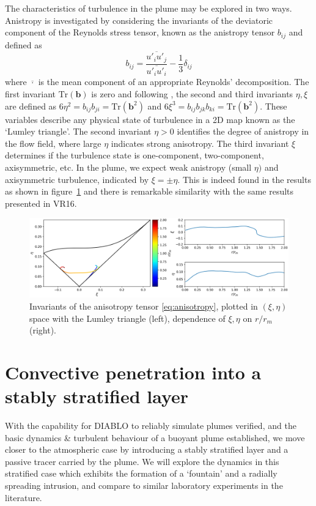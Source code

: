 \documentclass[a4paper]{article}
\begin{document}
The characteristics of turbulence in the plume may be explored in two ways. Anistropy is investigated by
considering the invariants of the deviatoric component of the Reynolds stress tensor, known as the
anistropy tensor $b_{ij}$ and defined as
\begin{equation}
	b_{ij} = \frac{\overline{u'_iu'_j}}{\overline{u'_iu'_i}} - \frac{1}{3}\delta_{ij}
	\label{eq:anisotropy}
\end{equation}
where $\overline{\cdot}$ is the mean component of an appropriate Reynolds' decomposition. The first invariant
$\mathrm{Tr}(\bm{b})$ is zero and following \citet{lumley1977}, the second and third invariants $\eta, \xi$
are defined as $6\eta^2 = b_{ij}b_{ji} = \mathrm{Tr}(\bm{b}^2)$ and $6\xi^3 = b_{ij}b_{jk}b_{ki} =
\mathrm{Tr}(\bm{b}^2)$. These variables describe any physical state of turbulence in a 2D map known as the
`Lumley triangle'. The second invariant $\eta > 0$ identifies the degree of anistropy in the flow field, where
large $\eta$ indicates strong anisotropy. The third invariant $\xi$ determines if the turbulence state is
one-component, two-component, axisymmetric, etc. In the plume, we expect weak anistropy (small $\eta)$ and
axisymmetric turbulence, indicated by $\xi = \pm \eta$. This is indeed found in the results as shown in
figure~\ref{fig:turbulence} and there is remarkable similarity with the same results presented in VR16.

\begin{figure}
	\centering
	\includegraphics[width=\textwidth]{mvr/fig13}
	\caption{Invariants of the anisotropy tensor \eqref{eq:anisotropy}, plotted in $(\xi,\eta)$ space with the
		Lumley triangle (left), dependence of $\xi, \eta$ on $r/r_m$ (right).}
	\label{fig:turbulence}
\end{figure}


\section{Convective penetration into a stably stratified layer}
With the capability for DIABLO to reliably simulate plumes verified, and the basic dynamics \& turbulent
behaviour of a buoyant plume established, we move closer to the atmospheric case by introducing a stably
stratified layer and a passive tracer carried by the plume. We will explore the dynamics in this stratified
case which exhibits the formation of a `fountain' and a radially spreading intrusion, and compare to similar
laboratory experiments in the literature.
\end{document}
